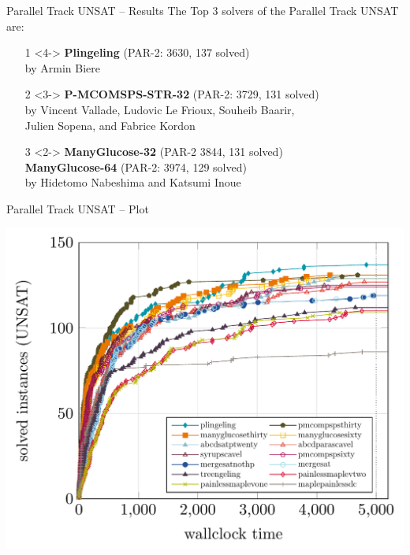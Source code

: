 \documentclass{beamer}
\begin{document}
\begin{frame}{Parallel Track UNSAT -- Results}
The Top 3 solvers of the Parallel Track UNSAT are:
\begin{itemize}

\item[1]<4-> {\bf Plingeling} (PAR-2: 3630, 137 solved)\\
by Armin Biere
\item[2]<3-> {\bf P-MCOMSPS-STR-32} (PAR-2: 3729, 131 solved)\\
by Vincent Vallade, Ludovic Le Frioux, Souheib Baarir,\\Julien Sopena, and Fabrice Kordon

\item[3]<2-> {\bf ManyGlucose-32} (PAR-2 3844, 131 solved)\\
{\bf ManyGlucose-64} (PAR-2: 3974, 129 solved)\\
by Hidetomo Nabeshima and Katsumi Inoue
\end{itemize}
\end{frame}


\begin{frame}{Parallel Track UNSAT -- Plot}

\centering
\includegraphics[width=.8\textwidth]{parallel-UNSAT}

\end{frame}
\end{document}
